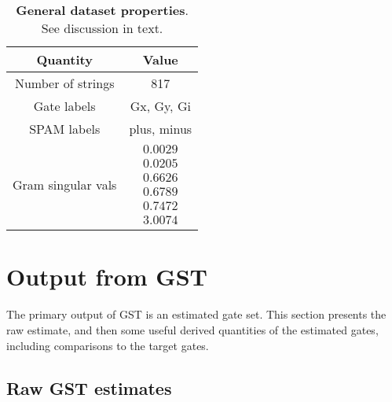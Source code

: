 \documentclass{article}[11pt]
\begin{document}
\begin{table}[h]
\begin{center}
\begin{tabular}[l]{|c|c|}
\hline
Quantity & Value \\ \hline
Number of strings & 817 \\ \hline
Gate labels & Gx, Gy, Gi \\ \hline
SPAM labels & plus, minus \\ \hline
Gram singular vals & \small$ \begin{array}{c}
0.0029 \\ 
0.0205 \\ 
0.6626 \\ 
0.6789 \\ 
0.7472 \\ 
3.0074
 \end{array} $
 \\ \hline
\end{tabular}

\caption{\textbf{General dataset properties}.  See discussion in text.\label{datasetOverviewTable}}
\end{center}
\end{table}

\section{Output from GST\label{secOutput}}

The primary output of GST is an estimated gate set.  This section presents the raw estimate, and then some useful derived quantities of the estimated gates, including comparisons to the target gates.

\subsection{Raw GST estimates}
\end{document}
